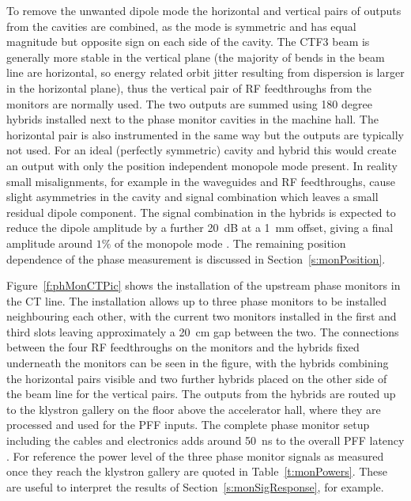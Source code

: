 To remove the unwanted dipole mode the horizontal and vertical pairs of outputs from the cavities are combined, as the mode is symmetric and has equal magnitude but opposite sign on each side of the cavity. The CTF3 beam is generally more stable in the vertical plane (the majority of bends in the beam line are horizontal, so energy related orbit jitter resulting from dispersion is larger in the horizontal plane), thus the vertical pair of RF feedthroughs from the monitors are normally used. The two outputs are summed using 180 degree hybrids \cite{alexCWS13} installed next to the phase monitor cavities in the machine hall. The horizontal pair is also instrumented in the same way but the outputs are typically not used. For an ideal (perfectly symmetric) cavity and hybrid this would create an output with only the position independent monopole mode present. In reality small misalignments, for example in the waveguides and RF feedthroughs, cause slight asymmetries in the cavity and signal combination which leaves a small residual dipole component. The signal combination in the hybrids is expected to reduce the dipole amplitude by a further 20~dB at a 1~mm offset, giving a final amplitude around \(1\%\) of the monopole mode \cite{alexCWS13}. The remaining position dependence of the phase measurement is discussed in Section~\ref{s:monPosition}.

Figure~\ref{f:phMonCTPic} shows the installation of the upstream phase monitors in the CT line. The installation allows up to three phase monitors to be installed neighbouring each other, with the current two monitors installed in the first and third slots leaving approximately a 20~cm gap between the two. The connections between the four RF feedthroughs on the monitors and the hybrids fixed underneath the monitors can be seen in the figure, with the hybrids combining the horizontal pairs visible and two further hybrids placed on the other side of the beam line for the vertical pairs. The outputs from the hybrids are routed up to the klystron gallery on the floor above the accelerator hall, where they are processed and used for the PFF inputs. The complete phase monitor setup including the cables and electronics adds around 50~ns to the overall PFF latency \cite{alexPriv}. For reference the power level of the three phase monitor signals as measured once they reach the klystron gallery are quoted in Table~\ref{t:monPowers}. These are useful to interpret the results of Section~\ref{s:monSigResponse}, for example. %

